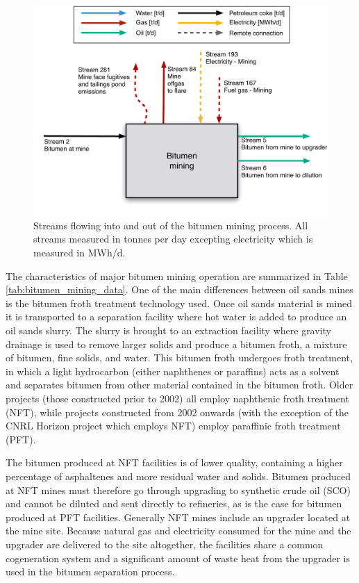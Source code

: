 \documentclass[11pt]{report}
\begin{document}
\begin{figure}
\includegraphics[width=0.85\columnwidth]{images/Bitumen_Mining_PF.pdf}
\caption{Streams flowing into and out of the bitumen mining process. All streams measured in tonnes per day excepting electricity which is measured in MWh/d.}
\label{fig:mining_PF}
\end{figure}

\clearpage


The characteristics of major bitumen mining operation are summarized in Table \ref{tab:bitumen_mining_data}. One of the main differences between oil sands mines is the bitumen froth treatment technology used. Once oil sands material is mined it is transported to a separation facility where hot water is added to produce an oil sands slurry. The slurry is brought to an extraction facility where gravity drainage is used to remove larger solids and produce a bitumen froth, a mixture of bitumen, fine solids, and water. This bitumen froth undergoes froth treatment, in which a light hydrocarbon (either naphthenes or paraffins) acts as a solvent and separates bitumen from other material contained in the bitumen froth.  Older projects (those constructed prior to 2002) all employ naphthenic froth treatment (NFT), while projects constructed from 2002 onwards (with the exception of the CNRL Horizon project which employs NFT) employ paraffinic froth treatment (PFT).  

The bitumen produced at NFT facilities is of lower quality, containing a higher percentage of asphaltenes and more residual water and solids. Bitumen produced at NFT mines must therefore go through upgrading to synthetic crude oil (SCO) and cannot be diluted and sent directly to refineries, as is the case for bitumen produced at PFT facilities. Generally NFT mines include an upgrader located at the mine site. Because natural gas and electricity consumed for the mine and the upgrader are delivered to the site altogether, the facilities share a common cogeneration system and a significant amount of waste heat from the upgrader is used in the bitumen separation process. 
\end{document}
